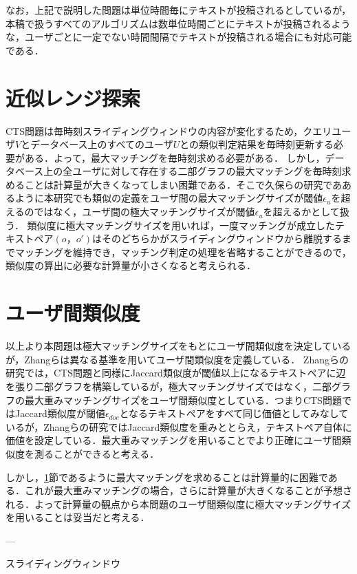 なお，上記で説明した問題は単位時間毎にテキストが投稿されるとしているが，本稿で扱うすべてのアルゴリズムは数単位時間ごとにテキストが投稿されるような，ユーザごとに一定でない時間間隔でテキストが投稿される場合にも対応可能である．

\section{近似レンジ探索}\label{kinjirange}
CTS問題は毎時刻スライディングウィンドウの内容が変化するため，クエリユーザ$V$とデータベース上のすべてのユーザ$U$との類似判定結果を毎時刻更新する必要がある．よって，最大マッチングを毎時刻求める必要がある．
しかし，データベース上の全ユーザに対して存在する二部グラフの最大マッチングを毎時刻求めることは計算量が大きくなってしまい困難である．そこで久保ら\cite{kubo}の研究でああるように本研究でも類似の定義をユーザ間の最大マッチングサイズが閾値$\epsilon_u$を超えるのではなく，ユーザ間の極大マッチングサイズが閾値$\epsilon_u$を超えるかとして扱う．
類似度に極大マッチングサイズを用いれば，一度マッチングが成立したテキストペア$(o，o')$はそのどちらかがスライディングウィンドウから離脱するまでマッチングを維持でき，マッチング判定の処理を省略することができるので，類似度の算出に必要な計算量が小さくなると考えられる．


\section{ユーザ間類似度}
以上より本問題は極大マッチングサイズをもとにユーザ間類似度を決定しているが，Zhangら\cite{zhang2021clustering}は異なる基準を用いてユーザ間類似度を定義している．
Zhangらの研究では，CTS問題と同様にJaccard類似度が閾値以上になるテキストペアに辺を張り二部グラフを構築しているが，極大マッチングサイズではなく，二部グラフの最大重みマッチングサイズをユーザ間類似度としている．つまりCTS問題ではJaccard類似度が閾値$\epsilon_{doc}$となるテキストペアをすべて同じ価値としてみなしているが，Zhangらの研究ではJaccard類似度を重みととらえ，テキストペア自体に価値を設定している．最大重みマッチングを用いることでより正確にユーザ間類似度を測ることができると考える．

しかし，\ref{kinjirange}節であるように最大マッチングを求めることは計算量的に困難である．これが最大重みマッチングの場合，さらに計算量が大きくなることが予想される．よって計算量の観点から本問題のユーザ間類似度に極大マッチングサイズを用いることは妥当だと考える．

---

スライディングウィンドウ



